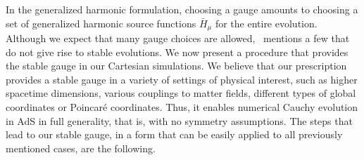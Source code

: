 \documentclass[aps,letterpaper,twocolumn,nofootinbib]{revtex4}
\numberwithin{equation}{section}
\begin{document}
In the generalized harmonic formulation, choosing a gauge amounts to choosing a set of generalized harmonic source functions $\bar{H}_\mu$ for the entire evolution. Although we expect that many gauge choices are allowed,~\cite{Bantilan:2012vu} mentions a few that do not give rise to stable evolutions. We now present a procedure that provides the stable gauge in our Cartesian simulations. We believe that our prescription provides a stable gauge in a variety of settings of physical interest, such as higher spacetime dimensions, various couplings to matter fields, different types of global coordinates or Poincar\'{e} coordinates. Thus, it enables numerical Cauchy evolution in AdS in full generality, that is, with no symmetry assumptions.
The steps that lead to our stable gauge, in a form that can be easily applied to all previously mentioned cases, are the following.
\end{document}
